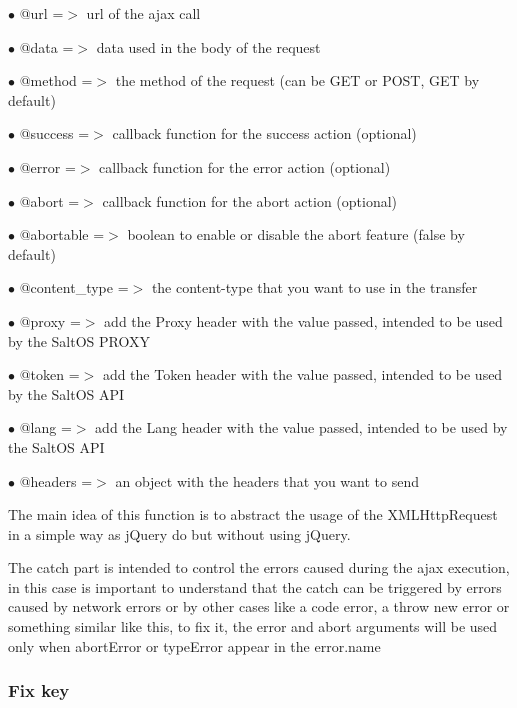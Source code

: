 \documentclass[a4paper]{article}
\begin{document}
\begin{compactitem}
\item[\color{myblue}$\bullet$] @url          =$>$ url of the ajax call
\item[\color{myblue}$\bullet$] @data         =$>$ data used in the body of the request
\item[\color{myblue}$\bullet$] @method       =$>$ the method of the request (can be GET or POST, GET by default)
\item[\color{myblue}$\bullet$] @success      =$>$ callback function for the success action (optional)
\item[\color{myblue}$\bullet$] @error        =$>$ callback function for the error action (optional)
\item[\color{myblue}$\bullet$] @abort        =$>$ callback function for the abort action (optional)
\item[\color{myblue}$\bullet$] @abortable    =$>$ boolean to enable or disable the abort feature (false by default)
\item[\color{myblue}$\bullet$] @content\_type =$>$ the content-type that you want to use in the transfer
\item[\color{myblue}$\bullet$] @proxy        =$>$ add the Proxy header with the value passed, intended to be used by the SaltOS PROXY
\item[\color{myblue}$\bullet$] @token        =$>$ add the Token header with the value passed, intended to be used by the SaltOS API
\item[\color{myblue}$\bullet$] @lang         =$>$ add the Lang header with the value passed, intended to be used by the SaltOS API
\item[\color{myblue}$\bullet$] @headers      =$>$ an object with the headers that you want to send
\end{compactitem}

The main idea of this function is to abstract the usage of the XMLHttpRequest in a simple
way as jQuery do but without using jQuery.

The catch part is intended to control the errors caused during the ajax execution,
in this case is important to understand that the catch can be triggered by errors
caused by network errors or by other cases like a code error, a throw new error or
something similar like this, to fix it, the error and abort arguments will be used
only when abortError or typeError appear in the error.name

\hypertarget{toc704}{}
\subsubsection{Fix key}
\end{document}
